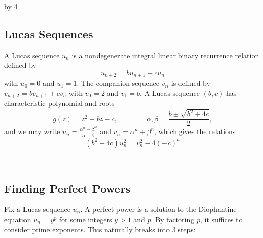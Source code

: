 \documentclass[12pt]{scrartcl}
\def\H{{\mathbb H}}
\def\Z{{\mathbb Z}}
\newcommand{\SL}{\text{SL}}
\def\anzspalten{4}
\newlength{\kastenwidth}
\newenvironment{kasten}{%
  \begin{lrbox}{\dummybox}%
    \begin{minipage}{0.96\linewidth}}%
    {\end{minipage}%
  \end{lrbox}%
  \raisebox{-\depth}{\psshadowbox[framesep=1em]{\usebox{\dummybox}}}\\[0.5em]}
\newenvironment{spalte}{%
  \setlength\kastenwidth{1.2\textwidth}
  \divide\kastenwidth by \anzspalten
  \begin{minipage}[t]{\kastenwidth}}{\end{minipage}\hfill}
\begin{document}
\begin{lrbox}{\spalten}
{\begin{spalte}
\begin{kasten}


\subsection*{\color{blue} Lucas Sequences}
A Lucas sequence $u_n$ is a nondegenerate integral linear binary recurrence relation defined by
\[u_{n+2} = bu_{n+1} + cu_n\]
with $u_0=0$ and $u_1 = 1$.  
The companion sequence $v_n$ is defined by $v_{n+2} = bv_{n+1} + cv_n$ with $v_0=2$ and $v_1 = b$.
A Lucas sequence $(b,c)$ has characteristic polynomial and roots
\[ g(z) = z^2 - bz - c, \qquad \qquad \alpha, \beta = \frac{b \pm \sqrt{b^2+4c}}{2},\]
and we may write
$u_n = \frac{\alpha^n - \beta^n}{\alpha - \beta}$ and $v_n = \alpha^n +\beta^n$, which gives the relations
\[(b^2+4c)u_n^2 = v_n^2 - 4(-c)^n\]

\end{kasten}

\begin{kasten}

\subsection*{\color{blue} Finding Perfect Powers}

Fix a Lucas sequence $u_n$.  A perfect power is a solution to the Diophantine equation $u_n = y^p$ for some integers $y>1$ and $p$.  By factoring $p$, it suffices to consider prime exponents.  This naturally breaks into 3 steps:

\begin{enumerate}


\end{enumerate}
\end{kasten}
\end{spalte}}
\end{lrbox}
\end{document}
